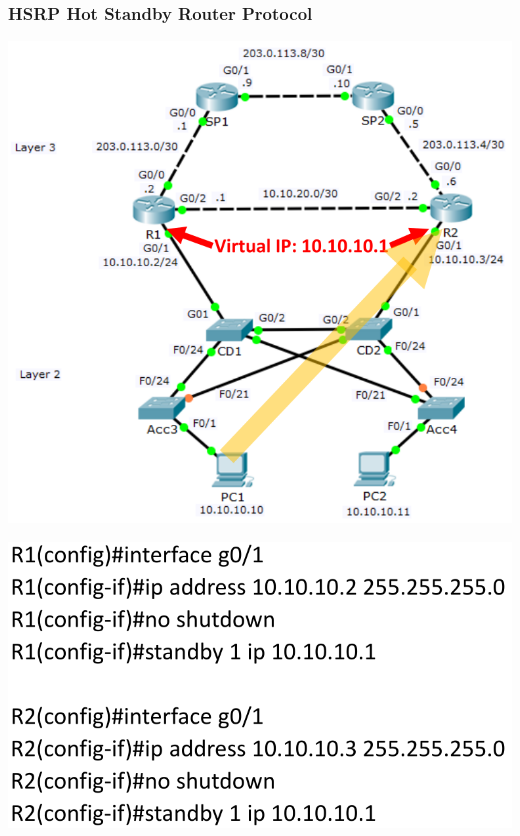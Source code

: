 \documentclass[pdflatex,compress,mathserif]{beamer}
\begin{document}
\begin{frame}
	\frametitle{HSRP Hot Standby Router Protocol}
	\begin{multicols}{2}
		\begin{center}
			\includegraphics[width=\linewidth]{img/img10}
		\end{center}
		\columnbreak
		\begin{center}
			\includegraphics[width=\linewidth]{img/img11}
		\end{center}
	\end{multicols}
\end{frame}
\end{document}

